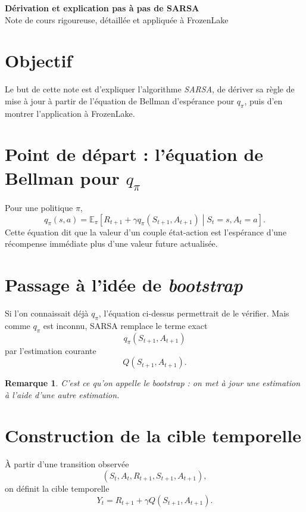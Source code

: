 \documentclass[11pt,a4paper]{article}
\newtheorem*{remarque}{Remarque}
\newcommand{\E}{\mathbb{E}}
\begin{document}
\begin{center}
    {\LARGE\bfseries Dérivation et explication pas à pas de SARSA}\\[0.4em]
    {\large Note de cours rigoureuse, détaillée et appliquée à FrozenLake}
\end{center}

\vspace{0.6em}

\section{Objectif}

Le but de cette note est d'expliquer l'algorithme \emph{SARSA}, de dériver sa règle de mise à jour à partir de l'équation de Bellman d'espérance pour $q_{\pi}$, puis d'en montrer l'application à FrozenLake.

\section{Point de départ : l'équation de Bellman pour $q_{\pi}$}

Pour une politique $\pi$,
\[
q_{\pi}(s,a)=\E_{\pi}\!\left[R_{t+1}+\gamma q_{\pi}(S_{t+1},A_{t+1}) \middle\vert S_t=s,A_t=a\right].
\]
Cette équation dit que la valeur d'un couple état-action est l'espérance d'une récompense immédiate plus d'une valeur future actualisée.

\section{Passage à l'idée de \emph{bootstrap}}

Si l'on connaissait déjà $q_{\pi}$, l'équation ci-dessus permettrait de le vérifier. Mais comme $q_{\pi}$ est inconnu, SARSA remplace le terme exact
\[
q_{\pi}(S_{t+1},A_{t+1})
\]
par l'estimation courante
\[
Q(S_{t+1},A_{t+1}).
\]

\begin{remarque}
C'est ce qu'on appelle le \emph{bootstrap} : on met à jour une estimation à l'aide d'une autre estimation.
\end{remarque}

\section{Construction de la cible temporelle}

À partir d'une transition observée
\[
(S_t,A_t,R_{t+1},S_{t+1},A_{t+1}),
\]
on définit la cible temporelle
\[
Y_t = R_{t+1}+\gamma Q(S_{t+1},A_{t+1}).
\]
\end{document}
